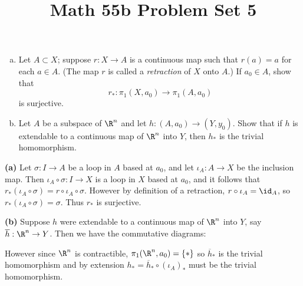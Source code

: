 \documentclass[11pt,letterpaper]{article}
\title{\textbf{Math 55b Problem Set 5}}
\begin{document}
\maketitle

\begin{problem}\noindent
    \begin{enumerate}[(a)]
        \item Let $A\subset X$; suppose $r : X \to A$ is a continuous map such that $r(a)=a$ for each $a\in A$. (The map $r$ is called a \emph{retraction} of $X$ onto $A$.) If $a_0\in A$, show that 
        \[
            r_* : \pi_1(X,a_0) \to \pi_1(A, a_0)
        \] 
        is surjective.
        \item Let $A$ be a subspace of $\R^n$ and let $h : (A, a_0) \to (Y, y_0)$. Show that if $h$ is extendable to a continuous map of $\R^n$ into $Y$, then $h_*$ is the trivial homomorphism. 
    \end{enumerate}
\end{problem}

\begin{solution}
    \textbf{(a)} Let $\sigma : I \to A$ be a loop in $A$ based at $a_0$, and let $\iota_A : A \to X$ be the inclusion map. Then $\iota_A \circ \sigma : I \to X$ is a loop in $X$ based at $a_0$, and it follows that $r_*(\iota_A \circ \sigma) = r\circ \iota_A\circ \sigma$. However by definition of a retraction, $r\circ \iota_A=\id_A$, so $r_*(\iota_A\circ \sigma)=\sigma$. Thus $r_*$ is surjective.

    \textbf{(b)} Suppose $h$ were extendable to a continuous map of $\R^n$ into $Y$, say $\overline{h} : \R^n \to Y$. Then we have the commutative diagrams:
    \begin{center}
    \end{center}
    However since $\R^n$ is contractible, $\pi_1(\R^n, a_0)=\{*\}$ so $\overline{h}_*$ is the trivial homomorphism and by extension $h_* = \overline{h}_*\circ (\iota_A)_*$ must be the trivial homomorphism.
\end{solution}
\end{document}
